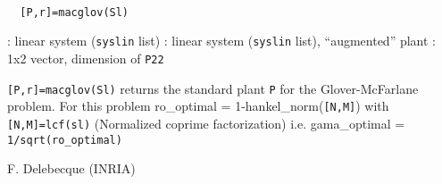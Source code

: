 \begin{mandesc}
   \\ %
\end{mandesc}
\begin{calling_sequence}
\begin{verbatim}
  [P,r]=macglov(Sl)  
\end{verbatim}
\end{calling_sequence}
\begin{parameters}
  \begin{varlist}
    : linear system (\verb!syslin! list)
    : linear system (\verb!syslin! list), ``augmented'' plant
    : 1x2 vector, dimension of \verb!P22!
  \end{varlist}
\end{parameters}
\begin{mandescription}
  \verb![P,r]=macglov(Sl)! returns the standard plant
  \verb!P! for the Glover-McFarlane problem.
  For this problem ro\_optimal = 1-hankel\_norm(\verb![N,M]!)
  with \verb![N,M]=lcf(sl)! (Normalized coprime factorization) i.e.
  gama\_optimal = \verb!1/sqrt(ro_optimal)!
\end{mandescription}
\begin{authors}
  F. Delebecque (INRIA)
\end{authors}
